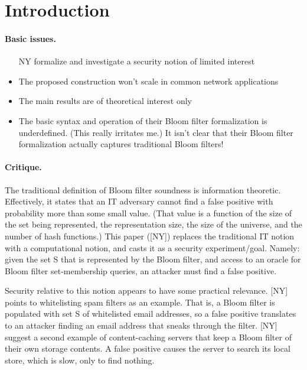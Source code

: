 \section{Introduction}
\paragraph{Basic issues. }
\begin{itemize}
\item [NY] formalize and investigate a security notion of limited interest
\item The proposed construction won’t scale in common network applications
\item The main results are of theoretical interest only
\item The basic syntax and operation of their Bloom filter formalization is underdefined.  (This really irritates me.)  It isn’t clear that their Bloom filter formalization actually captures traditional Bloom filters!
\end{itemize}

\paragraph{Critique. }
The traditional definition of Bloom filter soundness is information theoretic.  Effectively, it states that an IT adversary cannot find a false positive with probability more than some small value.  (That value is a function of the size of the set being represented, the representation size, the size of the universe, and the number of hash functions.)  This paper ([NY]) replaces the traditional IT notion with a computational notion, and casts it as a security experiment/goal.  Namely: given the set S that is represented by the Bloom filter, and access to an oracle for Bloom filter set-membership queries, an attacker must find a false positive.  


Security relative to this notion appears to have some practical relevance.  [NY] points to whitelisting spam filters as an example.  That is, a Bloom filter is populated with set S of whitelisted email addresses, so a false positive translates to an attacker finding an email address that sneaks through the filter.  [NY] suggest a second example of content-caching servers that keep a Bloom filter of their own storage contents.  A false positive causes the server to search its local store, which is slow, only to find nothing.

